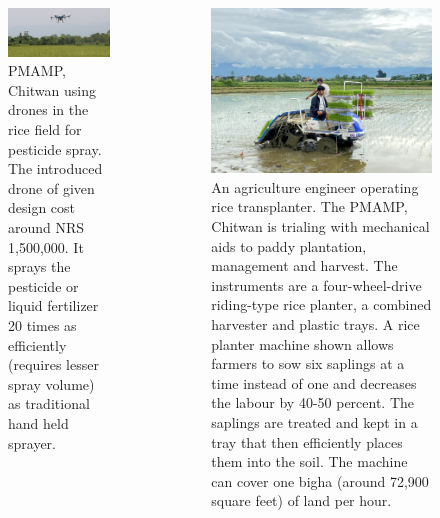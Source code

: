 \documentclass[11pt,dvipsnames,ignorenonframetext,aspectratio=169]{beamer}
\begin{document}
\begin{frame}{}
\protect\hypertarget{section-4}{}
\begin{columns}[T, onlytextwidth]

\begin{figure}
\includegraphics[width=0.98\linewidth]{../images/drone_pesticide_application} \caption{PMAMP, Chitwan using drones in the rice field for pesticide spray. The introduced drone of given design cost around NRS 1,500,000. It sprays the pesticide or liquid fertilizer 20 times as efficiently (requires lesser spray volume) as traditional hand held sprayer.}\label{fig:drone-spraying-pesticides-pmamp}
\end{figure}


\begin{figure}
\includegraphics[width=0.98\linewidth]{../images/Mechanical-Transplanter-chitwan} \caption{An agriculture engineer operating rice transplanter. The PMAMP, Chitwan is trialing with mechanical aids to paddy plantation, management and harvest. The instruments are a four-wheel-drive riding-type rice planter, a combined harvester and plastic trays. A rice planter machine shown allows farmers to sow six saplings at a time instead of one and decreases the labour by 40-50 percent. The saplings are treated and kept in a tray that then efficiently places them into the soil. The machine can cover one bigha (around 72,900 square feet) of land per hour.}\label{fig:mechanical-rice-planter}
\end{figure}

\end{columns}
\end{frame}
\end{document}
